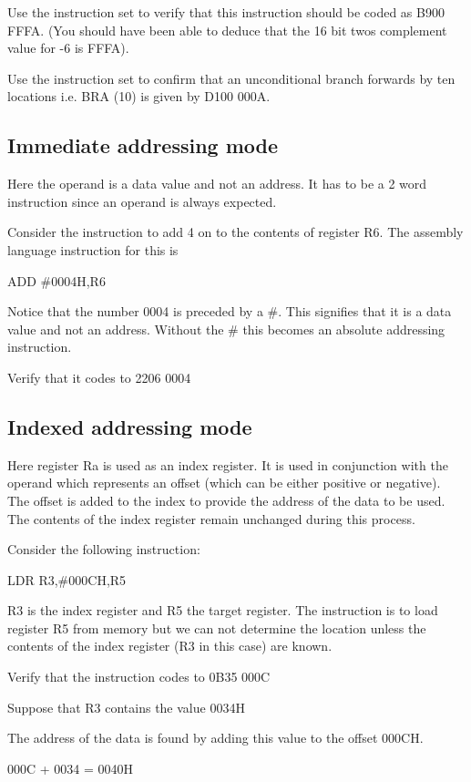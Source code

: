 \documentclass{article}
\begin{document}
Use the instruction set to verify that this instruction should be coded as B900 FFFA. (You should have been able to deduce that the 16 bit twos complement value for -6 is FFFA).

Use the instruction set to confirm that an unconditional branch forwards by ten locations i.e. BRA (10) is given by D100 000A.

\subsection{Immediate addressing mode}

Here the operand is a data value and not an address. It has to be a 2 word instruction since an operand is always expected.

Consider the instruction to add 4 on to the contents of register R6. The assembly language instruction for this is

\qquad ADD \#0004H,R6

Notice that the number 0004 is preceded by a \#. This signifies that it is a data value and not an address. Without the \# this becomes an absolute addressing instruction.

Verify that it codes to 2206 0004

\subsection{Indexed addressing mode}

Here register Ra is used as an index register. It is used in conjunction with the operand which represents an offset (which can be either positive or negative). The offset is added to the index to provide the address of the data to be used. The contents of the index register remain unchanged during this process.

Consider the following instruction:

\qquad LDR R3,\#000CH,R5

R3 is the index register and R5 the target register. The instruction is to load register R5 from memory but we can not determine the location unless the contents of the index register (R3 in this case) are known.

Verify that the instruction codes to 0B35 000C

Suppose that R3 contains the value 0034H

The address of the data is found by adding this value to the offset 000CH.

\qquad 000C + 0034 = 0040H
\end{document}
